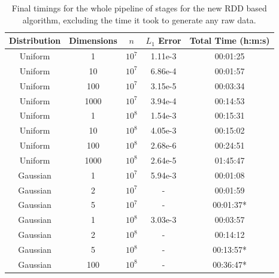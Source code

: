 \documentclass{report}
\begin{document}
\begin{table}[htbp]
\begin{center}
\begin{tabular}{|c  c  c | c | c |}
	\hline
	Distribution &  Dimensions &  $n$ & $L_1$ Error & Total Time (h:m:s)\\
	\hline
	Uniform	& 1  & 		$10^7$ & 1.11e-3   &   00:01:25 \\
	Uniform	& 10  & 	$10^7$ & 6.86e-4   &   00:01:57 \\
	Uniform	& 100  & 	$10^7$ & 3.15e-5   &   00:03:34 \\
	Uniform	& 1000  & 	$10^7$ & 3.94e-4   &   00:14:53 \\
	\hline                                   
	Uniform & 1  & 		$10^8$  & 1.54e-3  &   00:15:31 \\
	Uniform & 10  & 	$10^8$  & 4.05e-3  &   00:15:02 \\
	Uniform & 100  & 	$10^8$  & 2.68e-6  &   00:24:51 \\
	Uniform & 1000  & 	$10^8$  & 2.64e-5  &   01:45:47 \\
	\hline
	\hline
	Gaussian  & 1  & 	$10^7$ & 5.94e-3 &    00:01:08   \\
	Gaussian  & 2  & 	$10^7$ & - 	 &    00:01:59   \\
	Gaussian  & 5  & 	$10^7$ & - 	 &    00:01:37*     \\
	\hline
	Gaussian  & 1  & 	$10^8$ & 3.03e-3 &    00:03:57   \\
	Gaussian  & 2  & 	$10^8$ & - 	 &    00:14:12  \\
	Gaussian  & 5  & 	$10^8$ & - 	 &    00:13:57* \\
	Gaussian  & 100  & 	$10^8$ & - 	 &    00:36:47* \\
	\hline
\end{tabular}
\end{center}
\caption{Final timings for the whole pipeline of stages for the new RDD based algorithm, excluding the time it took to generate any raw data.}
\label{rdd_table}
\end{table}
\end{document}
